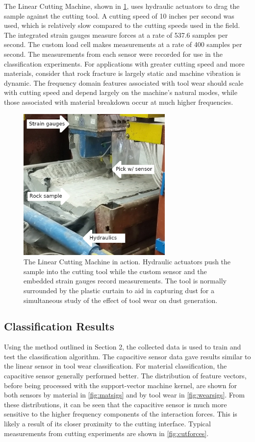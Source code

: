 The Linear Cutting Machine, shown in \ref{fig:lcmaction},
 uses hydraulic actuators to drag the sample against the cutting tool.
A cutting speed of 10 inches per second was used, which is relatively slow 
 compared to the cutting speeds used in the field.
The integrated strain gauges measure forces at a rate of 537.6 samples per second. 
The custom load cell makes measurements at a rate of 400 samples per second.
The measurements from each sensor were recorded for use in the classification experiments.
For applications with greater cutting speed and more materials, 
 consider that rock fracture is largely static and machine vibration is dynamic.
The frequency domain features associated with tool wear should scale with cutting speed 
 and depend largely on the machine's natural modes, 
 while those associated with material breakdown occur at much higher frequencies.

\begin{figure}[t!]
\centering
\includegraphics[width=3in]{figures/p1_media/Fig6.jpg}
\caption{
The Linear Cutting Machine in action. Hydraulic actuators push the sample into the cutting tool
while the custom sensor and the embedded strain gauges record measurements. 
The tool is normally surrounded by the plastic curtain to aid in capturing dust for a 
 simultaneous study of the effect of tool wear on dust generation.
}
\label{fig:lcmaction}
\end{figure}

\subsection{Classification Results}

Using the method outlined in Section 2, the collected data is used to train and test
 the classification algorithm.
The capacitive sensor data gave results similar to the linear sensor in tool wear classification.
For material classification, the capacitive sensor generally performed better.
The distribution of feature vectors, before being processed with the support-vector machine kernel,
 are shown for both sensors by material in \ref{fig:matsigs} and by tool wear in \ref{fig:wearsigs}. 
From these distributions, it can be seen that the capacitive sensor is much more sensitive to the higher frequency 
 components of the interaction forces. 
This is likely a result of its closer proximity to the cutting interface.
Typical measurements from cutting experiments are shown in \ref{fig:cutforces}. 

